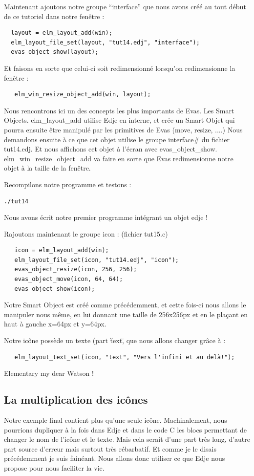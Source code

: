 \documentclass[a4paper]{efr}
\begin{document}
Maintenant ajoutons notre groupe ``interface'' que nous avons créé au tout
début de ce tutoriel dans notre fenêtre :

\begin{lstlisting}
  layout = elm_layout_add(win);
  elm_layout_file_set(layout, "tut14.edj", "interface");
  evas_object_show(layout);
\end{lstlisting}

Et faisons en sorte que celui-ci soit redimensionné lorsqu'on redimensionne la
fenêtre :
\begin{lstlisting}
   elm_win_resize_object_add(win, layout);
\end{lstlisting}

Nous rencontrons ici un des concepts les plus importants de Evas. Les Smart
Objects. elm\_layout\_add utilise Edje en interne, et crée un Smart Objet qui
pourra ensuite être manipulé par les primitives de Evas (move, resize, ....)
Nous demandons ensuite à ce que cet objet utilise le groupe \"interface\# du
fichier tut14.edj. Et nous affichons cet objet à l'écran avec
evas\_object\_show. elm\_win\_resize\_object\_add va faire en sorte que Evas
redimensionne notre objet à la taille de la fenêtre.

Recompilons notre programme et testons :
\begin{lstlisting}
./tut14
\end{lstlisting}

Nous avons écrit notre premier programme intégrant un objet edje !

Rajoutons maintenant le groupe icon : (fichier tut15.c)
\begin{lstlisting}
   icon = elm_layout_add(win);
   elm_layout_file_set(icon, "tut14.edj", "icon");
   evas_object_resize(icon, 256, 256);
   evas_object_move(icon, 64, 64);
   evas_object_show(icon);
\end{lstlisting}

Notre Smart Object est créé comme précédemment, et cette fois-ci nous allons
le manipuler nous même, en lui donnant une taille de 256x256px et en le
plaçant en haut à gauche x=64px et y=64px.

Notre icône possède un texte (part \"text\", que nous allons changer grâce à :
\begin{lstlisting}
   elm_layout_text_set(icon, "text", "Vers l'infini et au delà!");
\end{lstlisting}

Elementary my dear Watson !

\subsection{La multiplication des icônes}
Notre exemple final contient plus qu'une seule icône. Machinalement, nous
pourrions dupliquer à la fois dans Edje et dans le code C les blocs permettant
de changer le nom de l'icône et le texte. Mais cela serait d'une part très long,
d'autre part source d'erreur mais surtout très rébarbatif. Et comme je le disais précédemment
je suis fainéant. Nous allons donc utiliser ce que Edje nous propose pour nous
faciliter la vie.
\end{document}
